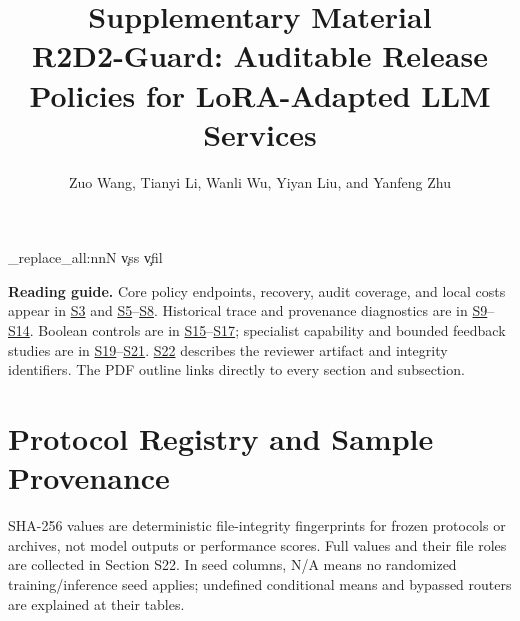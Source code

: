 \documentclass[journal,onecolumn]{IEEEtran}
\begin{document}
\title{Supplementary Material\\R2D2-Guard: Auditable Release Policies for LoRA-Adapted LLM Services}
\author{Zuo Wang, Tianyi Li, Wanli Wu, Yiyan Liu, and Yanfeng Zhu}
\maketitle
\makeatletter
\ExplSyntaxOn
\regex_replace_all:nnN { \c{vss} } { \c{vfil} } \LT@output
\ExplSyntaxOff
\makeatother

\renewcommand{\thesection}{S\arabic{section}}
\renewcommand{\thetable}{S\arabic{table}}
\renewcommand{\thefigure}{S\arabic{figure}}
\renewcommand{\theequation}{S\arabic{equation}}
\noindent\textbf{Reading guide.} Core policy endpoints, recovery, audit coverage, and local costs appear in \hyperref[sec:s3]{S3} and \hyperref[sec:s5]{S5}--\hyperref[sec:s8]{S8}. Historical trace and provenance diagnostics are in \hyperref[sec:s9]{S9}--\hyperref[sec:s14]{S14}. Boolean controls are in \hyperref[sec:s15]{S15}--\hyperref[sec:s17]{S17}; specialist capability and bounded feedback studies are in \hyperref[sec:s19]{S19}--\hyperref[sec:s21]{S21}. \hyperref[sec:integrity-identifiers]{S22} describes the reviewer artifact and integrity identifiers. The PDF outline links directly to every section and subsection.

\section{Protocol Registry and Sample Provenance}
\label{sec:s1}
SHA-256 values are deterministic file-integrity fingerprints for frozen protocols or archives, not model outputs or performance scores. Full values and their file roles are collected in Section S22. In seed columns, N/A means no randomized training/inference seed applies; undefined conditional means and bypassed routers are explained at their tables.
\end{document}
